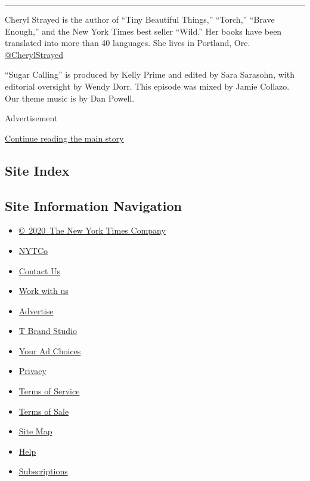 \begin{center}\rule{0.5\linewidth}{\linethickness}\end{center}

Cheryl Strayed is the author of ``Tiny Beautiful Things,'' ``Torch,''
``Brave Enough,'' and the New York Times best seller ``Wild.'' Her books
have been translated into more than 40 languages. She lives in Portland,
Ore.
\href{https://twitter.com/CherylStrayed?ref_src=twsrc\%5Egoogle\%7Ctwcamp\%5Eserp\%7Ctwgr\%5Eauthor}{@CherylStrayed}

``Sugar Calling'' is produced by Kelly Prime and edited by Sara
Sarasohn, with editorial oversight by Wendy Dorr. This episode was mixed
by Jamie Collazo. Our theme music is by Dan Powell.

Advertisement

\protect\hyperlink{after-bottom}{Continue reading the main story}

\hypertarget{site-index}{%
\subsection{Site Index}\label{site-index}}

\hypertarget{site-information-navigation}{%
\subsection{Site Information
Navigation}\label{site-information-navigation}}

\begin{itemize}
\tightlist
\item
  \href{https://help.nytimes.com/hc/en-us/articles/115014792127-Copyright-notice}{©~2020~The
  New York Times Company}
\end{itemize}

\begin{itemize}
\tightlist
\item
  \href{https://www.nytco.com/}{NYTCo}
\item
  \href{https://help.nytimes.com/hc/en-us/articles/115015385887-Contact-Us}{Contact
  Us}
\item
  \href{https://www.nytco.com/careers/}{Work with us}
\item
  \href{https://nytmediakit.com/}{Advertise}
\item
  \href{http://www.tbrandstudio.com/}{T Brand Studio}
\item
  \href{https://www.nytimes.com/privacy/cookie-policy\#how-do-i-manage-trackers}{Your
  Ad Choices}
\item
  \href{https://www.nytimes.com/privacy}{Privacy}
\item
  \href{https://help.nytimes.com/hc/en-us/articles/115014893428-Terms-of-service}{Terms
  of Service}
\item
  \href{https://help.nytimes.com/hc/en-us/articles/115014893968-Terms-of-sale}{Terms
  of Sale}
\item
  \href{https://spiderbites.nytimes.com}{Site Map}
\item
  \href{https://help.nytimes.com/hc/en-us}{Help}
\item
  \href{https://www.nytimes.com/subscription?campaignId=37WXW}{Subscriptions}
\end{itemize}
